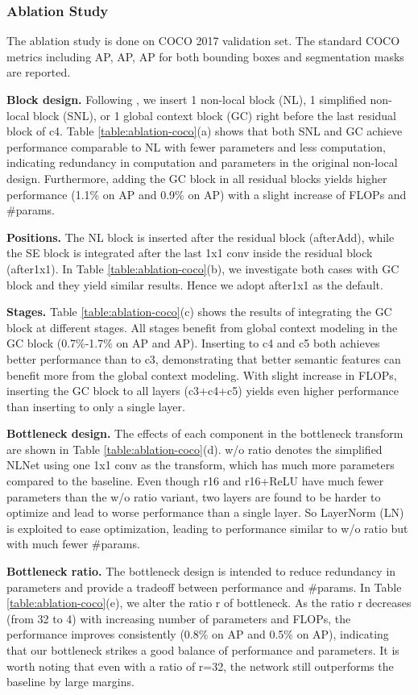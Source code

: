 \documentclass[10pt,twocolumn,letterpaper]{article}
\begin{document}
\subsubsection{Ablation Study}
The ablation study is done on COCO 2017 validation set. The standard COCO metrics including AP, AP, AP for both bounding boxes and segmentation masks are reported.


\textbf{Block design.}
Following \cite{wang2017non}, we insert 1 non-local block (NL), 1 simplified non-local block (SNL), or 1 global context block (GC) right before the last residual block of c4.
Table \ref{table:ablation-coco}(a) shows that both SNL and GC achieve performance comparable to NL with fewer parameters and less computation,
indicating redundancy in computation and parameters in the original non-local design.
Furthermore, adding the GC block in all residual blocks yields higher performance (1.1\% on AP and 0.9\% on AP) with a slight increase of FLOPs and \#params.

\textbf{Positions.}
The NL block is inserted after the residual block (afterAdd), while the SE block is integrated after the last 1x1 conv inside the residual block (after1x1).
In Table \ref{table:ablation-coco}(b), we investigate both cases with GC block and they yield similar results. Hence we adopt after1x1 as the default.


\textbf{Stages.}
Table \ref{table:ablation-coco}(c) shows the results of integrating the GC block at different stages.
All stages benefit from global context modeling in the GC block (0.7\%-1.7\% on AP and AP).
Inserting to c4 and c5 both achieves better performance than to c3, demonstrating that better semantic features can benefit more from the global context modeling.
With slight increase in FLOPs, inserting the GC block to all layers (c3+c4+c5) yields even higher performance than inserting to only a single layer.

\textbf{Bottleneck design.}
The effects of each component in the bottleneck transform are shown in Table \ref{table:ablation-coco}(d).
w/o ratio denotes the simplified NLNet using one 1x1 conv as the transform, which has much more parameters compared to the baseline.
Even though r16 and r16+ReLU have much fewer parameters than the w/o ratio variant, two layers are found to be harder to optimize and lead to worse performance than a single layer.
So LayerNorm (LN) is exploited to ease optimization, leading to performance similar to w/o ratio but with much fewer \#params.

\textbf{Bottleneck ratio.}
The bottleneck design is intended to reduce redundancy in parameters and provide a tradeoff between performance and \#params.
In Table \ref{table:ablation-coco}(e), we alter the ratio r of bottleneck.
As the ratio r decreases (from 32 to 4) with increasing number of parameters and FLOPs, the performance improves consistently (0.8\% on AP and 0.5\% on AP), indicating that our bottleneck strikes a good balance of performance and parameters.
It is worth noting that even with a ratio of r=32, the network still outperforms the baseline by large margins.
\end{document}

